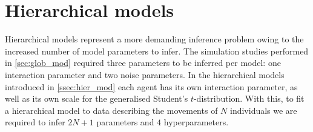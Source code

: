 \section{Hierarchical models}

Hierarchical models represent a more demanding inference problem owing to the increased
number of model parameters to infer. The simulation studies performed in
\cref{sec:glob_mod} required three parameters to be inferred per model: one interaction
parameter and two noise parameters. In the hierarchical models introduced in
\cref{ssec:hier_mod} each agent has its own interaction parameter, as well as its own
scale for the generalised Student's $t$-distribution. With this, to fit a hierarchical
model to data describing the movements of $N$ individuals we are required to infer $2N+1$
parameters and $4$ hyperparameters.



